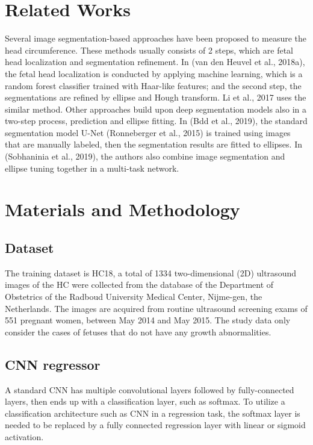 \documentclass{article}
\begin{document}
\section{Related Works}

Several image segmentation-based approaches have been proposed to measure the head circumference. These methods usually consists of 2 steps, which are fetal head localization and segmentation refinement. In (van den Heuvel et al., 2018a), the fetal head localization is conducted by applying machine learning, which is a random forest classifier trained with Haar-like features; and the second step, the segmentations are refined by ellipse and Hough transform. Li et al., 2017 uses the similar method. Other approaches build upon deep segmentation models also in a two-step process, prediction and ellipse fitting. In (Bdd et al., 2019), the standard segmentation model U-Net (Ronneberger et al., 2015) is trained using images that are manually labeled, then the segmentation results are fitted to ellipses. In (Sobhaninia et al., 2019), the authors also combine image segmentation and ellipse tuning together in a multi-task network.  



\section{Materials and Methodology}

\subsection{Dataset}
The training dataset is HC18, a total of 1334 two-dimensional (2D) ultrasound images of the HC were collected from the database of the Department of Obstetrics of the Radboud University Medical Center, Nijme-gen, the Netherlands. The images are acquired from routine ultrasound screening exams of 551 pregnant women, between May 2014 and May 2015. The study data only consider the cases of fetuses that do not have any growth abnormalities. 

\subsection{CNN regressor}
A standard CNN has multiple convolutional layers followed by fully-connected layers, then ends up with a classification layer, such as softmax. To utilize a classification architecture such as CNN in a regression task, the softmax layer is needed to be replaced by a fully connected regression layer with linear or sigmoid activation. 
\end{document}
